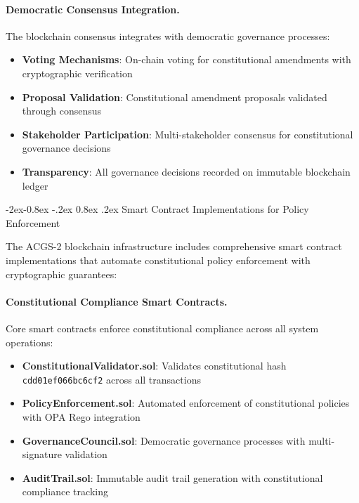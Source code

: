 \documentclass[manuscript,screen,9pt]{acmart}
\makeatletter
\renewcommand\subsubsection{\@startsection{subsubsection}{3}{\z@}%
  {-2ex\@plus -0.8ex \@minus -.2ex}%
  {0.8ex \@plus .2ex}%
  {\normalfont\normalsize\bfseries}}
\makeatother
\begin{document}
\paragraph{Democratic Consensus Integration.} The blockchain consensus integrates with democratic governance processes:
\begin{itemize}[itemsep=1pt,parsep=1pt]
    \item \textbf{Voting Mechanisms}: On-chain voting for constitutional amendments with cryptographic verification
    \item \textbf{Proposal Validation}: Constitutional amendment proposals validated through consensus
    \item \textbf{Stakeholder Participation}: Multi-stakeholder consensus for constitutional governance decisions
    \item \textbf{Transparency}: All governance decisions recorded on immutable blockchain ledger
\end{itemize}

\subsubsection{Smart Contract Implementations for Policy Enforcement}
\label{subsubsec:smart_contract_implementations}

The ACGS-2 blockchain infrastructure includes comprehensive smart contract implementations that automate constitutional policy enforcement with cryptographic guarantees:

\paragraph{Constitutional Compliance Smart Contracts.} Core smart contracts enforce constitutional compliance across all system operations:
\begin{itemize}[itemsep=1pt,parsep=1pt]
    \item \textbf{ConstitutionalValidator.sol}: Validates constitutional hash \texttt{cdd01ef066bc6cf2} across all transactions
    \item \textbf{PolicyEnforcement.sol}: Automated enforcement of constitutional policies with OPA Rego integration
    \item \textbf{GovernanceCouncil.sol}: Democratic governance processes with multi-signature validation
    \item \textbf{AuditTrail.sol}: Immutable audit trail generation with constitutional compliance tracking
\end{itemize}
\end{document}
